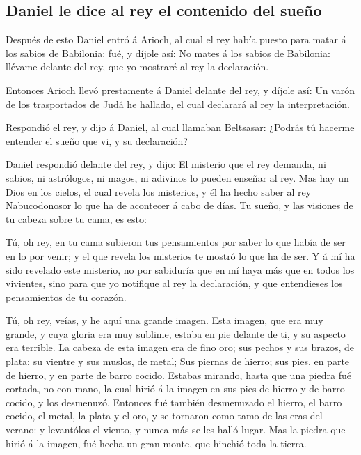 \hypertarget{daniel-le-dice-al-rey-el-contenido-del-sueuxf1o}{%
\subsection{Daniel le dice al rey el contenido del
sueño}\label{daniel-le-dice-al-rey-el-contenido-del-sueuxf1o}}

 Después de esto Daniel entró á Arioch, al cual el rey
había puesto para matar á los sabios de Babilonia; fué, y díjole así: No
mates á los sabios de Babilonia: llévame delante del rey, que yo
mostraré al rey la declaración.

 Entonces Arioch llevó prestamente á Daniel delante del
rey, y díjole así: Un varón de los trasportados de Judá he hallado, el
cual declarará al rey la interpretación.

 Respondió el rey, y dijo á Daniel, al cual llamaban
Beltsasar: ¿Podrás tú hacerme entender el sueño que vi, y su
declaración?

 Daniel respondió delante del rey, y dijo: El misterio
que el rey demanda, ni sabios, ni astrólogos, ni magos, ni adivinos lo
pueden enseñar al rey.  Mas hay un Dios en los cielos, el
cual revela los misterios, y él ha hecho saber al rey Nabucodonosor lo
que ha de acontecer á cabo de días. Tu sueño, y las visiones de tu
cabeza sobre tu cama, es esto:

 Tú, oh rey, en tu cama subieron tus pensamientos por
saber lo que había de ser en lo por venir; y el que revela los misterios
te mostró lo que ha de ser.  Y á mí ha sido revelado este
misterio, no por sabiduría que en mí haya más que en todos los
vivientes, sino para que yo notifique al rey la declaración, y que
entendieses los pensamientos de tu corazón.

 Tú, oh rey, veías, y he aquí una grande imagen. Esta
imagen, que era muy grande, y cuya gloria era muy sublime, estaba en pie
delante de ti, y su aspecto era terrible.  La cabeza de
esta imagen era de fino oro; sus pechos y sus brazos, de plata; su
vientre y sus muslos, de metal;  Sus piernas de hierro;
sus pies, en parte de hierro, y en parte de barro cocido.
 Estabas mirando, hasta que una piedra fué cortada, no
con mano, la cual hirió á la imagen en sus pies de hierro y de barro
cocido, y los desmenuzó.  Entonces fué también
desmenuzado el hierro, el barro cocido, el metal, la plata y el oro, y
se tornaron como tamo de las eras del verano: y levantólos el viento, y
nunca más se les halló lugar. Mas la piedra que hirió á la imagen, fué
hecha un gran monte, que hinchió toda la tierra.


